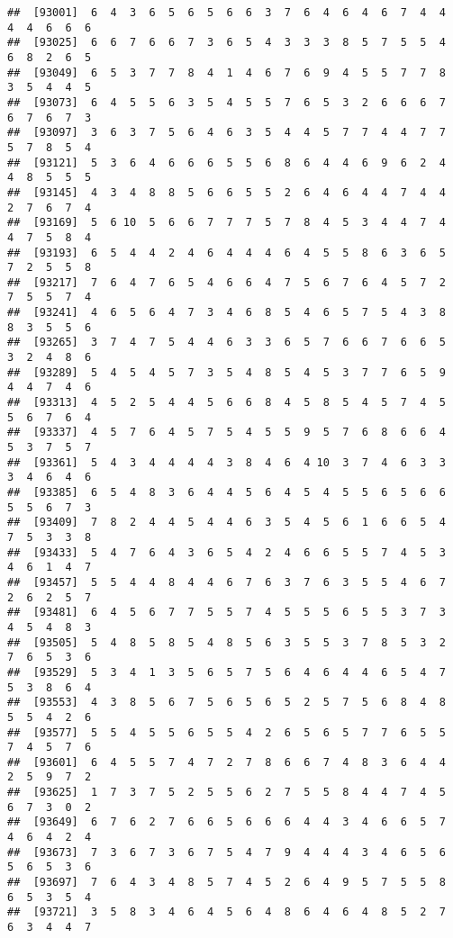 \documentclass[
]{book}
\begin{document}
\begin{verbatim}
##  [93001]  6  4  3  6  5  6  5  6  6  3  7  6  4  6  4  6  7  4  4  4  4  6  6  6
##  [93025]  6  6  7  6  6  7  3  6  5  4  3  3  3  8  5  7  5  5  4  6  8  2  6  5
##  [93049]  6  5  3  7  7  8  4  1  4  6  7  6  9  4  5  5  7  7  8  3  5  4  4  5
##  [93073]  6  4  5  5  6  3  5  4  5  5  7  6  5  3  2  6  6  6  7  6  7  6  7  3
##  [93097]  3  6  3  7  5  6  4  6  3  5  4  4  5  7  7  4  4  7  7  5  7  8  5  4
##  [93121]  5  3  6  4  6  6  6  5  5  6  8  6  4  4  6  9  6  2  4  4  8  5  5  5
##  [93145]  4  3  4  8  8  5  6  6  5  5  2  6  4  6  4  4  7  4  4  2  7  6  7  4
##  [93169]  5  6 10  5  6  6  7  7  7  5  7  8  4  5  3  4  4  7  4  4  7  5  8  4
##  [93193]  6  5  4  4  2  4  6  4  4  4  6  4  5  5  8  6  3  6  5  7  2  5  5  8
##  [93217]  7  6  4  7  6  5  4  6  6  4  7  5  6  7  6  4  5  7  2  7  5  5  7  4
##  [93241]  4  6  5  6  4  7  3  4  6  8  5  4  6  5  7  5  4  3  8  8  3  5  5  6
##  [93265]  3  7  4  7  5  4  4  6  3  3  6  5  7  6  6  7  6  6  5  3  2  4  8  6
##  [93289]  5  4  5  4  5  7  3  5  4  8  5  4  5  3  7  7  6  5  9  4  4  7  4  6
##  [93313]  4  5  2  5  4  4  5  6  6  8  4  5  8  5  4  5  7  4  5  5  6  7  6  4
##  [93337]  4  5  7  6  4  5  7  5  4  5  5  9  5  7  6  8  6  6  4  5  3  7  5  7
##  [93361]  5  4  3  4  4  4  4  3  8  4  6  4 10  3  7  4  6  3  3  3  4  6  4  6
##  [93385]  6  5  4  8  3  6  4  4  5  6  4  5  4  5  5  6  5  6  6  5  5  6  7  3
##  [93409]  7  8  2  4  4  5  4  4  6  3  5  4  5  6  1  6  6  5  4  7  5  3  3  8
##  [93433]  5  4  7  6  4  3  6  5  4  2  4  6  6  5  5  7  4  5  3  4  6  1  4  7
##  [93457]  5  5  4  4  8  4  4  6  7  6  3  7  6  3  5  5  4  6  7  2  6  2  5  7
##  [93481]  6  4  5  6  7  7  5  5  7  4  5  5  5  6  5  5  3  7  3  4  5  4  8  3
##  [93505]  5  4  8  5  8  5  4  8  5  6  3  5  5  3  7  8  5  3  2  7  6  5  3  6
##  [93529]  5  3  4  1  3  5  6  5  7  5  6  4  6  4  4  6  5  4  7  5  3  8  6  4
##  [93553]  4  3  8  5  6  7  5  6  5  6  5  2  5  7  5  6  8  4  8  5  5  4  2  6
##  [93577]  5  5  4  5  5  6  5  5  4  2  6  5  6  5  7  7  6  5  5  7  4  5  7  6
##  [93601]  6  4  5  5  7  4  7  2  7  8  6  6  7  4  8  3  6  4  4  2  5  9  7  2
##  [93625]  1  7  3  7  5  2  5  5  6  2  7  5  5  8  4  4  7  4  5  6  7  3  0  2
##  [93649]  6  7  6  2  7  6  6  5  6  6  6  4  4  3  4  6  6  5  7  4  6  4  2  4
##  [93673]  7  3  6  7  3  6  7  5  4  7  9  4  4  4  3  4  6  5  6  5  6  5  3  6
##  [93697]  7  6  4  3  4  8  5  7  4  5  2  6  4  9  5  7  5  5  8  6  5  3  5  4
##  [93721]  3  5  8  3  4  6  4  5  6  4  8  6  4  6  4  8  5  2  7  6  3  4  4  7

\end{verbatim}
\end{document}
